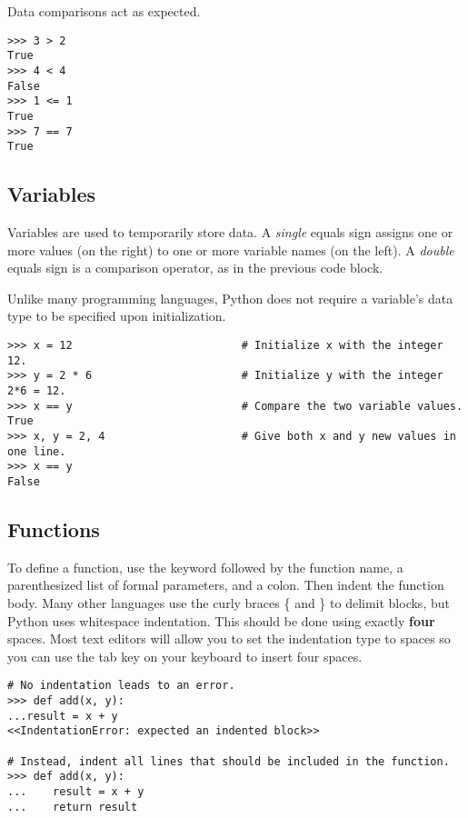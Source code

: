 Data comparisons act as expected.
\begin{lstlisting}
>>> 3 > 2
True
>>> 4 < 4
False
>>> 1 <= 1
True
>>> 7 == 7
True
\end{lstlisting}

\subsection*{Variables} %
Variables are used to temporarily store data.
A \emph{single} equals sign assigns one or more values (on the right) to one or more variable names (on the left).
A \emph{double} equals sign is a comparison operator, as in the previous code block.

Unlike many programming languages, Python does not require a variable's data type to be specified upon initialization.

\begin{lstlisting}
>>> x = 12                          # Initialize x with the integer 12.
>>> y = 2 * 6                       # Initialize y with the integer 2*6 = 12.
>>> x == y                          # Compare the two variable values.
True
>>> x, y = 2, 4                     # Give both x and y new values in one line.
>>> x == y
False
\end{lstlisting}

\subsection*{Functions} %

To define a function, use the  keyword followed by the function name, a parenthesized list of formal parameters, and a colon.
Then indent the function body.
Many other languages use the curly braces \{ and \} to delimit blocks, but Python uses whitespace indentation.
This should be done using exactly \textbf{four} spaces.
Most text editors will allow you to set the indentation type to spaces so you can use the tab key on your keyboard to insert four spaces.

\begin{lstlisting}
# No indentation leads to an error.
>>> def add(x, y):
...result = x + y
<<IndentationError: expected an indented block>>

# Instead, indent all lines that should be included in the function.
>>> def add(x, y):
...    result = x + y
...    return result
\end{lstlisting}

